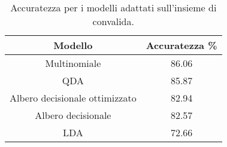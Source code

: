 \begin{table}[H]
\centering
\caption{Accuratezza per i modelli adattati sull'insieme di convalida.}
\begin{tabular}{cc}
\toprule
                        Modello &  Accuratezza \% \\
\midrule
                   Multinomiale &          86.06 \\
                            QDA &          85.87 \\
 Albero decisionale ottimizzato &          82.94 \\
             Albero decisionale &          82.57 \\
                            LDA &          72.66 \\
\bottomrule
\end{tabular}
\label{tab:acc}
\end{table}
